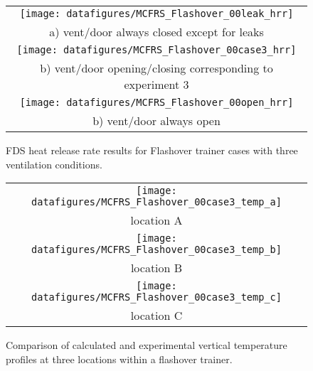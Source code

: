 \begin{figure}[\figoptions]
\begin{center}
\begin{tabular}{c}
 \texttt{[image: datafigures/MCFRS\_Flashover\_00leak\_hrr]}\\
 a) vent/door always closed except for leaks\\
 \texttt{[image: datafigures/MCFRS\_Flashover\_00case3\_hrr]}\\
 b) vent/door opening/closing corresponding to experiment 3\\
 \texttt{[image: datafigures/MCFRS\_Flashover\_00open\_hrr]}\\
 b) vent/door always open\\
\end{tabular}
\end{center}
\caption {FDS heat release rate results for Flashover trainer cases with three ventilation conditions.}
\label{figflashoverhrr}%
\end{figure}

\begin{figure}[\figoptions]
\begin{center}
\begin{tabular}{c}
\texttt{[image: datafigures/MCFRS\_Flashover\_00case3\_temp\_a]}\\
location A\\
\texttt{[image: datafigures/MCFRS\_Flashover\_00case3\_temp\_b]}\\
location B\\
\texttt{[image: datafigures/MCFRS\_Flashover\_00case3\_temp\_c]}\\
location C\\
\end{tabular}
\end{center}
\caption[Comparison of calculated and experimental vertical temperature profiles at three locations within a flashover trainer.]
{
Comparison of calculated and experimental vertical temperature profiles at three locations within a flashover trainer.}
\label{figflashovertemps}%
\end{figure}

